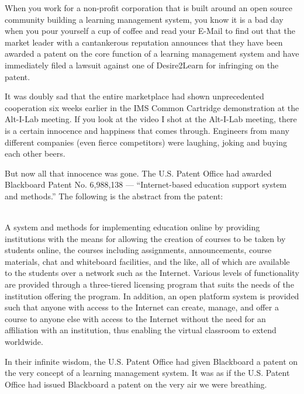 \documentclass[12pt]{book}
\begin{document}
When you work for a non-profit corporation that is built around an
open source community building a learning management system,
you know it is a bad day when you pour yourself a cup of coffee
and read your E-Mail to find out that the market leader
with a cantankerous reputation announces that they have been
awarded a patent on the core function of a learning management
system and have immediately filed a lawsuit against one of
Desire2Learn for infringing on the patent.

It was doubly sad that the entire marketplace had shown
unprecedented cooperation six weeks earlier in the IMS
Common Cartridge demonstration at the Alt-I-Lab meeting.
If you look at the video I shot at the Alt-I-Lab
meeting, there is a certain innocence and happiness that
comes through.  Engineers from many different companies
(even fierce competitors) were laughing, joking and buying
each other beers.

But now all that innocence was gone. The U.S. Patent Office
had awarded Blackboard Patent No. 6,988,138 --- ``Internet-based education
support system and methods.''  The following is the abstract
from the patent:\\
\\
\begin{sf}
A system and methods for implementing education online by
providing institutions with the means for allowing the creation of
courses to be taken by students online, the courses including
assignments, announcements, course materials, chat and whiteboard
facilities, and the like, all of which are available to the students
over a network such as the Internet. Various levels of functionality
are provided through a three-tiered licensing program that suits the
needs of the institution offering the program. In addition, an open
platform system is provided such that anyone with access to the
Internet can create, manage, and offer a course to anyone else
with access to the Internet without the need for an affiliation
with an institution, thus enabling the virtual classroom to extend worldwide.\\
\end{sf}

In their infinite wisdom, the U.S. Patent Office had given Blackboard a
patent on the very concept of a learning management system.
It was as if the U.S. Patent Office had issued Blackboard a
patent on the very air we were breathing.
\end{document}
